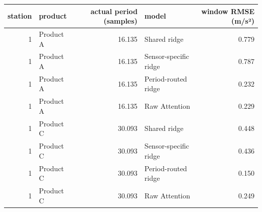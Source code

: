 \begin{tabular}{rlrlr}
\toprule
station & product & actual period (samples) & model & window RMSE (m/s²) \\
\midrule
1 & Product A & 16.135 & Shared ridge & 0.779 \\
1 & Product A & 16.135 & Sensor-specific ridge & 0.787 \\
1 & Product A & 16.135 & Period-routed ridge & 0.232 \\
1 & Product A & 16.135 & Raw Attention & 0.229 \\
1 & Product C & 30.093 & Shared ridge & 0.448 \\
1 & Product C & 30.093 & Sensor-specific ridge & 0.436 \\
1 & Product C & 30.093 & Period-routed ridge & 0.150 \\
1 & Product C & 30.093 & Raw Attention & 0.249 \\
\bottomrule
\end{tabular}
